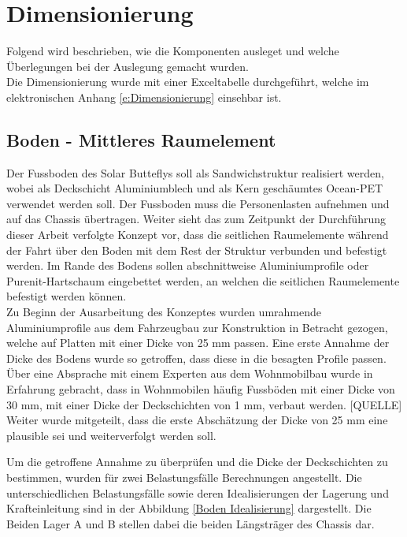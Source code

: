 \section{Dimensionierung}
Folgend wird beschrieben, wie die Komponenten ausleget und welche Überlegungen bei der Auslegung gemacht wurden.\\
Die Dimensionierung wurde mit einer Exceltabelle durchgeführt, welche im elektronischen Anhang \ref{e:Dimensionierung} einsehbar ist.

\subsection{Boden - Mittleres Raumelement}
\label{Boden}
Der Fussboden des Solar Butteflys soll als Sandwichstruktur realisiert werden, wobei als Deckschicht Aluminiumblech und als Kern geschäumtes Ocean-PET verwendet werden soll. Der Fussboden muss die Personenlasten aufnehmen und auf das Chassis übertragen. Weiter sieht das zum Zeitpunkt der Durchführung dieser Arbeit verfolgte Konzept vor, dass die seitlichen Raumelemente während der Fahrt über den Boden mit dem Rest der Struktur verbunden und befestigt werden. Im Rande des Bodens sollen abschnittweise Aluminiumprofile oder Purenit-Hartschaum eingebettet werden, an welchen die seitlichen Raumelemente befestigt werden können.\\
Zu Beginn der Ausarbeitung des Konzeptes wurden umrahmende Aluminiumprofile aus dem Fahrzeugbau zur Konstruktion in Betracht gezogen, welche auf Platten mit einer Dicke von 25 mm passen. Eine erste Annahme der Dicke des Bodens wurde so getroffen, dass diese in die besagten Profile passen. Über eine Absprache mit einem Experten aus dem Wohnmobilbau wurde in Erfahrung gebracht, dass in Wohnmobilen häufig Fussböden mit einer Dicke von 30 mm, mit einer Dicke der Deckschichten von 1 mm, verbaut werden. [QUELLE] Weiter wurde mitgeteilt, dass die erste Abschätzung der Dicke von 25 mm eine plausible sei und weiterverfolgt werden soll.

Um die getroffene Annahme zu überprüfen und die Dicke der Deckschichten zu bestimmen, wurden für zwei Belastungsfälle Berechnungen angestellt. Die unterschiedlichen Belastungsfälle sowie deren Idealisierungen der Lagerung und Krafteinleitung sind in der Abbildung \ref{Boden Idealisierung} dargestellt. Die Beiden Lager A und B stellen dabei die beiden Längsträger des Chassis dar.

